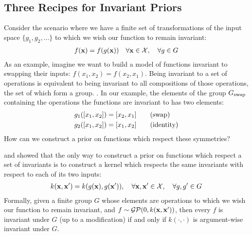 \subsection{Three Recipes for Invariant Priors}

Consider the scenario where we have a finite set of transformations of the input space $\{g_1, g_2, \ldots \}$ to which we wish our function to remain invariant:
%
\begin{align}
f({\bf{x}}) = f(g({\bf{x}}))  \quad \forall {\bf{x}} \in \mathcal{X}, \quad \forall g \in G
\end{align}
%
As an example, imagine we want to build a model of functions invariant to swapping their inputs: $f(x_1, x_2) = f(x_2, x_1)$.
Being invariant to a set of operations is equivalent to being invariant to all compositions of those operations, the set of which form a group. \citep[chapter 21]{armstrong1988groups}.
In our example, the elements of the group $G_\textnormal{swap}$ containing the operations the functions are invariant to has two elements:%
%
\begin{align}
g_1([x_1, x_2]) & = [x_2, x_1] \qquad \textnormal{(swap)} \\
g_2([x_1, x_2]) & = [x_1, x_2] \qquad \textnormal{(identity)}
\end{align}
%
How can we construct a prior on functions which respect these symmetries?

\citet{ginsbourger2012argumentwise} and \citet{Invariances13} showed that the only way to construct a \gp{} prior on functions which respect a set of invariants is to construct a kernel which respects the same invariants with respect to each of its two inputs:
%
\begin{align}
k({\bf{x}}, {\bf{x}}') = k( g({\bf{x}}), g({\bf{x}}')), \quad \forall {\bf{x}}, {\bf{x}}' \in \mathcal{X}, \quad \forall g, g' \in G
\end{align}
%
Formally, given a finite group $G$ whose elements are operations to which we wish our function to remain invariant, and $f \sim \mathcal{GP}\!\left(0,k({\bf{x}},{\bf{x}}')\right)$, then every $f$ is invariant under $G$ (up to a modification) if and only if $k(\cdot, \cdot)$ is argument-wise invariant under $G$.

